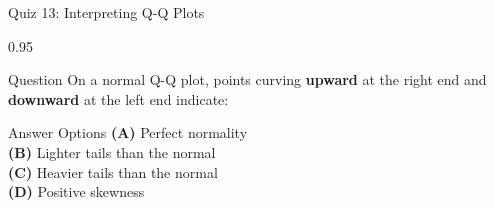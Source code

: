 \documentclass[9pt, aspectratio=169, t]{beamer}
\begin{document}
\begin{frame}{Quiz 13: Interpreting Q-Q Plots}
\begin{cminipage}{0.95\textwidth}
    \begin{alertblock}{Question}
        On a normal Q-Q plot, points curving \textbf{upward} at the right end and \textbf{downward} at the left end indicate:
    \end{alertblock}

    \vspace{0.5cm}
    \begin{block}{Answer Options}
    \textcolor{MainBlue}{\textbf{(A)}} Perfect normality\\[3pt]
    \textcolor{MainBlue}{\textbf{(B)}} Lighter tails than the normal\\[3pt]
    \textcolor{MainBlue}{\textbf{(C)}} Heavier tails than the normal\\[3pt]
    \textcolor{MainBlue}{\textbf{(D)}} Positive skewness
    \end{block}
\end{cminipage}
\end{frame}
\end{document}
